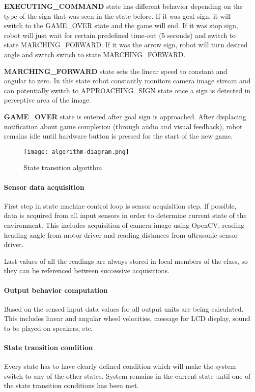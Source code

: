 \textbf{EXECUTING\_COMMAND} state has different behavior depending on the type of the sign that was seen in the state before. If it was goal sign, it will switch to the GAME\_OVER state and the game will end. If it was stop sign, robot will just wait for certain predefined time-out (5 seconds) and switch to state MARCHING\_FORWARD. If it was the arrow sign, robot will turn desired angle and switch switch to state MARCHING\_FORWARD.

\textbf{MARCHING\_FORWARD} state sets the linear speed to constant and angular to zero. In this state robot constantly monitors camera image stream and can potentially switch to APPROACHING\_SIGN state once a sign is detected in perceptive area of the image.

\textbf{GAME\_OVER} state is entered after goal sign is approached. After displacing notification about game completion (through audio and visual feedback), robot remains idle until hardware button is pressed for the start of the new game.

\begin{figure}[th!]
	\centering
	\texttt{[image: algorithm-diagram.png]}
	\caption{State transition algorithm}
	\label{fig:algorithm-diagram}
\end{figure}

\paragraph{Sensor data acquisition}

First step in state machine control loop is sensor acquisition step. If possible, data is acquired from all input sensors in order to determine current state of the environment. This includes acquisition of camera image using OpenCV, reading heading angle from motor driver and reading distances from ultrasonic sensor driver.

Last values of all the readings are always stored in local members of the class, so they can be referenced between successive acquisitions.

\paragraph{Output behavior computation}

Based on the sensed input data values for all output units are being calculated. This includes linear and angular wheel velocities, message for LCD display, sound to be played on speakers, etc.

\paragraph{State transition condition}

Every state has to have clearly defined condition which will make the system switch to any of the other states. System remains in the current state until one of the state transition conditions has been met.



